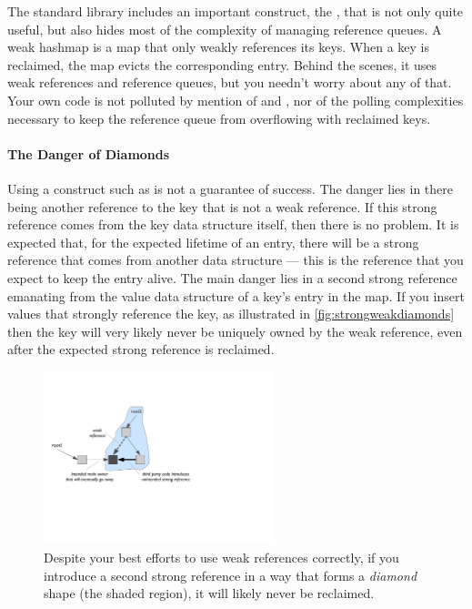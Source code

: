 The standard library includes an important construct, the ,
that is not only quite useful, but also hides most of the complexity of managing
reference queues. A weak hashmap is a map that only weakly references its keys.
When a key is reclaimed, the map evicts the corresponding entry. Behind the
scenes, it uses weak references and reference queues, but you needn't worry about
any of that. Your own code is not polluted by mention of 
and , nor of the polling complexities necessary to keep the
reference queue from overflowing with reclaimed keys.

\paragraph{The Danger of Diamonds}
\label{sec:strongweakdiamonds}

Using a construct such as  is not a guarantee of success. The
danger lies in there being another reference to the key that is not a weak
reference. If this strong reference comes from the key data structure itself,
then there is no problem. It is expected that, for the expected lifetime of an
entry, there will be a strong reference that comes from another data structure
--- this is the reference that you expect to keep the entry alive. The main
danger lies in a second strong reference emanating from the value data structure
of a key's entry in the map. If you insert values that strongly reference the
key, as illustrated in \autoref{fig:strongweakdiamonds} then the key will very
likely never be uniquely owned by the weak reference, even after the expected
strong reference is reclaimed.

\begin{figure}[h]   %
\centering
	\includegraphics[width=0.6\textwidth]{part2/Figures/lifetime/strongweakdiamonds}
	\caption{Despite your best efforts to use weak references correctly, if you
	introduce a second strong reference in a way that forms a
	\emph{diamond} shape (the shaded region), it will likely never be reclaimed.}
	\label{fig:strongweakdiamonds}
\end{figure}

